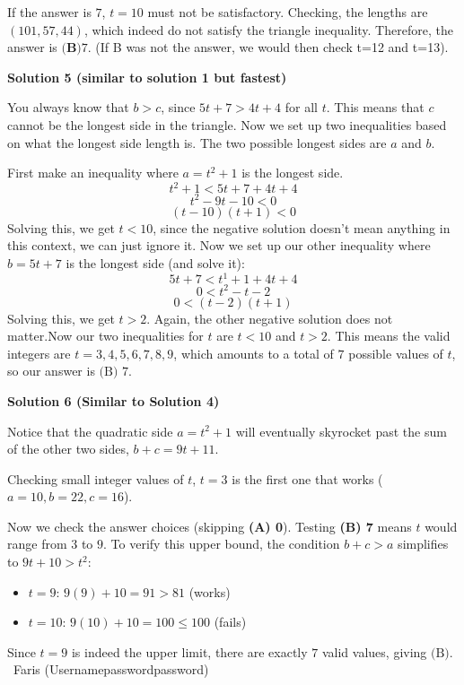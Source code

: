 \begin{enumerate}
 
If the answer is $7$, $t=10$ must not be satisfactory. Checking, the lengths are $(101, 57, 44)$, which indeed do not satisfy the triangle inequality. Therefore, the answer is $\boxed{\textbf{(B)} 7}$. (If B was not the answer, we would then check t=12 and t=13).

 



\textbf{Solution 5 (similar to solution 1 but fastest)}

You always know that $b>c$, since $5t+7>4t+4$ for all $t$. This means that $c$ cannot be the longest side in the triangle. Now we set up two inequalities based on what the longest side length is. The two possible longest sides are $a$ and $b$.

 First make an inequality where $a=t^2+1$ is the longest side.
 \[t^2+1<5t+7+4t+4\]
 \[t^2-9t-10<0\]
 \[(t-10)(t+1)<0\]Solving this, we get $t<10$, since the negative solution doesn't mean anything in this context, we can just ignore it. Now we set up our other inequality where $b=5t+7$ is the longest side (and solve it):
 \[5t+7<t^1+1+4t+4\]
 \[0<t^2-t-2\]
 \[0<(t-2)(t+1)\]Solving this, we get $t>2$. Again, the other negative solution does not matter.Now our two inequalities for $t$ are $t<10$ and $t>2$. This means the valid integers are $t=3,4,5,6,7,8,9$, which amounts to a total of $7$ possible values of $t$, so our answer is $\boxed{\text{(B) } 7}$.

 



\textbf{Solution 6 (Similar to Solution 4)}

Notice that the quadratic side $a = t^2 + 1$ will eventually skyrocket past the sum of the other two sides, $b + c = 9t + 11$. 

 Checking small integer values of $t$, $t = 3$ is the first one that works ($a = 10, b = 22, c = 16$). 

 Now we check the answer choices (skipping \textbf{(A) 0}). Testing \textbf{(B) 7} means $t$ would range from $3$ to $9$. To verify this upper bound, the condition $b + c > a$ simplifies to $9t + 10 > t^2$:

 
            \begin{itemize}
        \item $t = 9$: $9(9) + 10 = 91 > 81$ (works)
        \item $t = 10$: $9(10) + 10 = 100 \le 100$ (fails)
            \end{itemize}
            Since $t = 9$ is indeed the upper limit, there are exactly $7$ valid values, giving \textbf{$\text{(B)}$}. ~Faris (Usernamepasswordpassword)


\end{enumerate}
